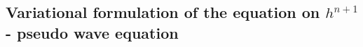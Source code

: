 %
%
%
%


\subsection{Variational formulation of the equation on $h^{n+1}$ - pseudo wave equation}

